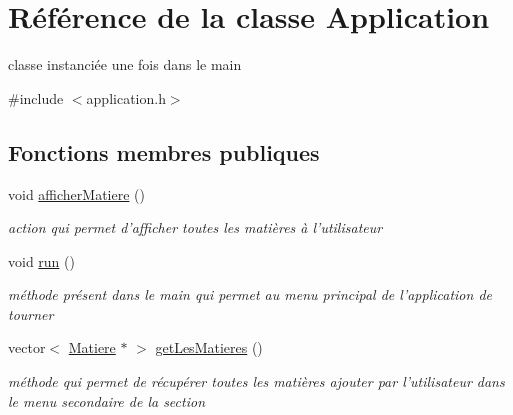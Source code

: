 \hypertarget{class_application}{\section{Référence de la classe Application}
\label{class_application}
}


classe instanciée une fois dans le main  




{\ttfamily \#include $<$application.\+h$>$}

\subsection*{Fonctions membres publiques}
\begin{DoxyCompactItemize}
\item 
\hypertarget{class_application_abc0b42851a0a44aa9d9150604c84bcc2}{void \hyperlink{class_application_abc0b42851a0a44aa9d9150604c84bcc2}{afficher\+Matiere} ()}\label{class_application_abc0b42851a0a44aa9d9150604c84bcc2}

\begin{DoxyCompactList}\small\item\em action qui permet d'afficher toutes les matières à l'utilisateur \end{DoxyCompactList}\item 
\hypertarget{class_application_a68965449404743bf1add056784d6cf81}{void \hyperlink{class_application_a68965449404743bf1add056784d6cf81}{run} ()}\label{class_application_a68965449404743bf1add056784d6cf81}

\begin{DoxyCompactList}\small\item\em méthode présent dans le main qui permet au menu principal de l'application de tourner \end{DoxyCompactList}\item 
\hypertarget{class_application_a0e74957eda5f689046bf6674a9795468}{vector$<$ \hyperlink{class_matiere}{Matiere} $\ast$ $>$ \hyperlink{class_application_a0e74957eda5f689046bf6674a9795468}{get\+Les\+Matieres} ()}\label{class_application_a0e74957eda5f689046bf6674a9795468}

\begin{DoxyCompactList}\small\item\em méthode qui permet de récupérer toutes les matières ajouter par l'utilisateur dans le menu secondaire de la section \end{DoxyCompactList}\end{DoxyCompactItemize}
